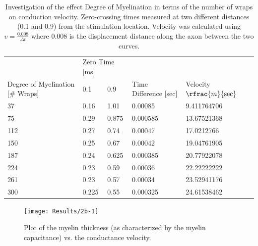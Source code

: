 \documentclass[12pt]{article}
\begin{document}
\begin{table}[h!]
\begin{tabular}{|l|l|l|l|l|}
                  & \multicolumn{2}{l}{Zero Time [ms]} &                     &                     \\
Degree of Myelination [\# Wraps] & 0.1              & 0.9             & Time Difference [sec] & Velocity $\rfrac{m}{\text{sec}}$ \\ \hline\hline
37                          & 0.16  & 1.01  & 0.00085               & 9.411764706        \\
75                          & 0.29  & 0.875 & 0.000585              & 13.67521368        \\
112                         & 0.27  & 0.74  & 0.00047               & 17.0212766         \\
150                         & 0.25  & 0.67  & 0.00042               & 19.04761905        \\
187                         & 0.24  & 0.625 & 0.000385              & 20.77922078        \\
224                         & 0.23  & 0.59  & 0.00036               & 22.22222222        \\
261                         & 0.23  & 0.57  & 0.00034               & 23.52941176        \\
300                         & 0.225 & 0.55  & 0.000325              & 24.61538462              
\end{tabular}
\caption{Investigation of the effect Degree of Myelination in terms of the number of wraps on conduction velocity. Zero-crossing times measured at two different distances (0.1 and 0.9) from the stimulation location. Velocity was calculated using $v = \frac{0.008}{\Delta t}$ where 0.008 is the displacement distance along the axon between the two curves. }
\label{table:2a}
\end{table}




\begin{figure}[H]
\centering
\texttt{[image: Results/2b-1]}
\caption{\label{fig:P2b1} Plot of the myelin thickness (as characterized by the myelin capacitance) vs. the conductance velocity.}
\end{figure}
\end{document}
